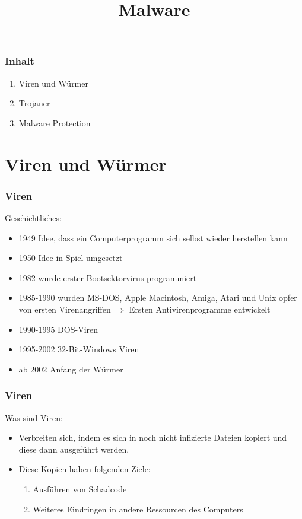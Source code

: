 \documentclass{beamer}
\title{Malware}
\author{}
\date{}
\begin{document}
\maketitle
\begin{frame}
	\frametitle{Inhalt}
	\begin{enumerate}
		\item Viren und Würmer
		\item Trojaner
		\item Malware Protection
	\end{enumerate}
\end{frame}


\section{Viren und Würmer}
\begin{frame}
	\frametitle{Viren}
		\begin{block}{Geschichtliches:}
			\begin{itemize}
				\item 1949 Idee, dass ein Computerprogramm sich selbst wieder herstellen kann
				\item 1950 Idee in Spiel umgesetzt
				\item 1982 wurde erster Bootsektorvirus programmiert
				\item 1985-1990 wurden  MS-DOS, Apple Macintosh, Amiga, Atari und Unix opfer von ersten Virenangriffen
				$\Rightarrow$ Ersten Antivirenprogramme entwickelt
				\item 1990-1995 DOS-Viren
				\item 1995-2002 32-Bit-Windows Viren
				\item ab 2002 Anfang der Würmer
			\end{itemize}
		\end{block}
\end{frame}

\begin{frame}
	\frametitle{Viren}
		\begin{block}{Was sind Viren:}
			\begin{itemize}
				\item Verbreiten sich, indem es sich in noch nicht infizierte Dateien kopiert und diese dann ausgeführt werden.
				\item Diese Kopien haben folgenden Ziele:
				\begin{enumerate}
					\item Ausführen von Schadcode
					\item Weiteres Eindringen in andere Ressourcen des Computers
				\end{enumerate}
			\end{itemize}
		\end{block}
\end{frame}
\end{document}
